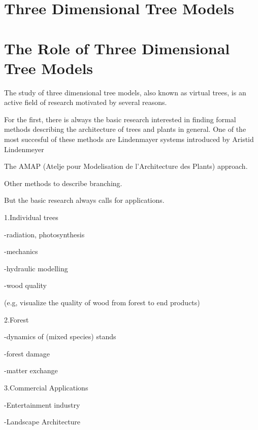 \section{Three Dimensional Tree Models}

\section{The Role of Three Dimensional Tree Models}

The study of three dimensional tree models, also
known as virtual trees, is an active
field of research motivated by several reasons. 

For the first, there is always the basic research interested in
finding formal methods describing the architecture of
trees and plants in general. One of the most succesful of 
these methods are Lindenmayer systems
introduced by Aristid Lindenmeyer

The AMAP (Atelje pour Modelisation de l'Architecture des Plants) approach.

Other methods to describe branching.

But the basic research always calls for applications. 

1.Individual trees

-radiation, photosynthesis

-mechanics

-hydraulic modelling

-wood quality

(e.g, visualize the quality of wood from forest to end products)

2.Forest

-dynamics of (mixed species) stands

-forest damage 

-matter exchange

3.Commercial Applications

-Entertainment industry

-Landscape Architecture

